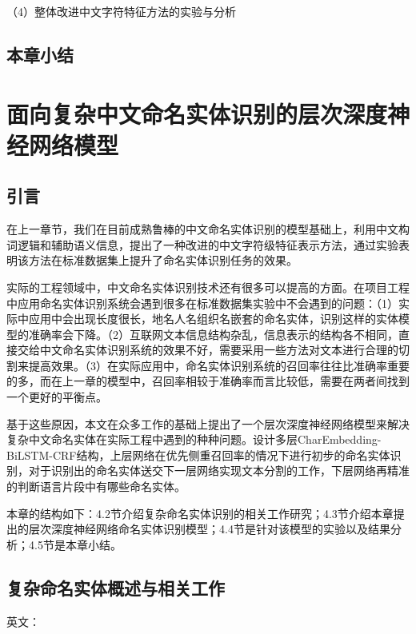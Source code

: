 \documentclass[winfonts,master,oneside,nobackinfo]{njuthesis}
\begin{document}
（4）整体改进中文字符特征方法的实验与分析




\section{本章小结}





\chapter{面向复杂中文命名实体识别的层次深度神经网络模型}

\section{引言}

在上一章节，我们在目前成熟鲁棒的中文命名实体识别的模型基础上，利用中文构词逻辑和辅助语义信息，提出了一种改进的中文字符级特征表示方法，通过实验表明该方法在标准数据集上提升了命名实体识别任务的效果。

实际的工程领域中，中文命名实体识别技术还有很多可以提高的方面。在项目工程中应用命名实体识别系统会遇到很多在标准数据集实验中不会遇到的问题：（1）实际中应用中会出现长度很长，地名人名组织名嵌套的命名实体，识别这样的实体模型的准确率会下降。（2）互联网文本信息结构杂乱，信息表示的结构各不相同，直接交给中文命名实体识别系统的效果不好，需要采用一些方法对文本进行合理的切割来提高效果。（3）在实际应用中，命名实体识别系统的召回率往往比准确率重要的多，而在上一章的模型中，召回率相较于准确率而言比较低，需要在两者间找到一个更好的平衡点。

基于这些原因，本文在众多工作的基础上提出了一个层次深度神经网络模型来解决复杂中文命名实体在实际工程中遇到的种种问题。设计多层CharEmbedding-BiLSTM-CRF结构，上层网络在优先侧重召回率的情况下进行初步的命名实体识别，对于识别出的命名实体送交下一层网络实现文本分割的工作，下层网络再精准的判断语言片段中有哪些命名实体。

本章的结构如下：4.2节介绍复杂命名实体识别的相关工作研究；4.3节介绍本章提出的层次深度神经网络命名实体识别模型；4.4节是针对该模型的实验以及结果分析；4.5节是本章小结。





\section{复杂命名实体概述与相关工作}

英文：
\end{document}
